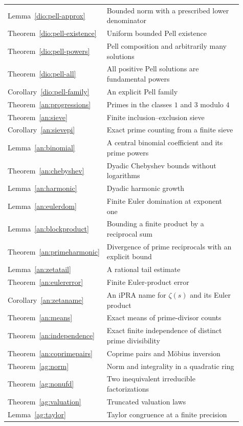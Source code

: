 \begin{longtable}{p{0.16\linewidth}p{0.75\linewidth}}
Lemma~\ref{dio:pell-approx} & Bounded norm with a prescribed lower denominator\\
Theorem~\ref{dio:pell-existence} & Uniform bounded Pell existence\\
Theorem~\ref{dio:pell-powers} & Pell composition and arbitrarily many solutions\\
Theorem~\ref{dio:pell-all} & All positive Pell solutions are fundamental powers\\
Corollary~\ref{dio:pell-family} & An explicit Pell family\\
Theorem~\ref{an:progressions} & Primes in the classes $1$ and $3$ modulo $4$\\
Theorem~\ref{an:sieve} & Finite inclusion--exclusion sieve\\
Corollary~\ref{an:sievepi} & Exact prime counting from a finite sieve\\
Lemma~\ref{an:binomial} & A central binomial coefficient and its prime powers\\
Theorem~\ref{an:chebyshev} & Dyadic Chebyshev bounds without logarithms\\
Lemma~\ref{an:harmonic} & Dyadic harmonic growth\\
Lemma~\ref{an:eulerdom} & Finite Euler domination at exponent one\\
Lemma~\ref{an:blockproduct} & Bounding a finite product by a reciprocal sum\\
Theorem~\ref{an:primeharmonic} & Divergence of prime reciprocals with an explicit bound\\
Lemma~\ref{an:zetatail} & A rational tail estimate\\
Theorem~\ref{an:eulererror} & Finite Euler-product error\\
Corollary~\ref{an:zetaname} & An iPRA name for $\zeta(s)$ and its Euler product\\
Theorem~\ref{an:means} & Exact means of prime-divisor counts\\
Theorem~\ref{an:independence} & Exact finite independence of distinct prime divisibility\\
Theorem~\ref{an:coprimepairs} & Coprime pairs and M\"obius inversion\\
Theorem~\ref{ag:norm} & Norm and integrality in a quadratic ring\\
Theorem~\ref{ag:nonufd} & Two inequivalent irreducible factorizations\\
Theorem~\ref{ag:valuation} & Truncated valuation laws\\
Lemma~\ref{ag:taylor} & Taylor congruence at a finite precision\\

\end{longtable}
